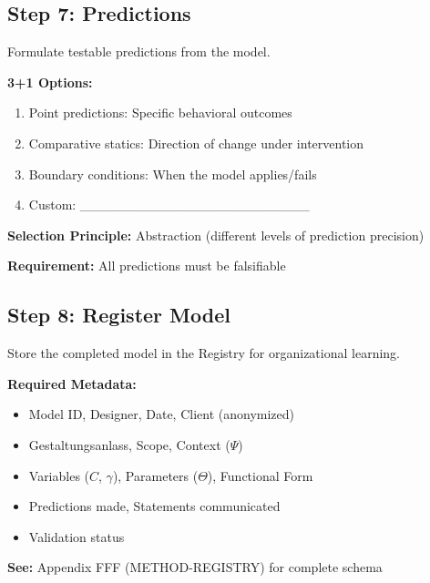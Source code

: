 \subsection{Step 7: Predictions}

Formulate testable predictions from the model.

\begin{tcolorbox}[colback=white, colframe=black,
    title=Step 7: Prediction Formulation]
\textbf{3+1 Options:}
\begin{enumerate}
\item[$\square$] Point predictions: Specific behavioral outcomes
\item[$\square$] Comparative statics: Direction of change under intervention
\item[$\square$] Boundary conditions: When the model applies/fails
\item[$\square$] Custom: \_\_\_\_\_\_\_\_\_\_\_\_\_\_\_\_\_\_\_\_\_\_\_\_
\end{enumerate}

\textbf{Selection Principle:} Abstraction (different levels of prediction precision)

\textbf{Requirement:} All predictions must be falsifiable
\end{tcolorbox}

\subsection{Step 8: Register Model}

Store the completed model in the Registry for organizational learning.

\begin{tcolorbox}[colback=white, colframe=black,
    title=Step 8: Model Registration]
\textbf{Required Metadata:}
\begin{itemize}[nosep]
\item Model ID, Designer, Date, Client (anonymized)
\item Gestaltungsanlass, Scope, Context ($\Psi$)
\item Variables ($C$, $\gamma$), Parameters ($\Theta$), Functional Form
\item Predictions made, Statements communicated
\item Validation status
\end{itemize}

\textbf{See:} Appendix FFF (METHOD-REGISTRY) for complete schema
\end{tcolorbox}


